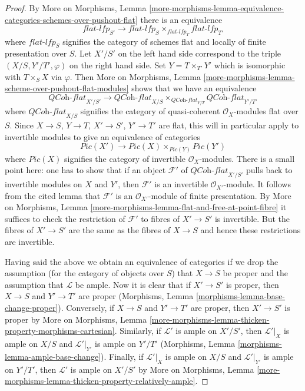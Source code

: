 \documentclass{stacks-project}
\theoremstyle{plain}
\theoremstyle{definition}
\theoremstyle{remark}
\numberwithin{equation}{subsection}
\begin{document}
\begin{proof}
By More on Morphisms, Lemma
\ref{more-morphisms-lemma-equivalence-categories-schemes-over-pushout-flat}
there is an equivalence
$$
\textit{flat-lfp}_{S'}
\longrightarrow
\textit{flat-lfp}_S \times_{\textit{flat-lfp}_T} \textit{flat-lfp}_{T'}
$$
where $\textit{flat-lfp}_S$ signifies the category of schemes flat
and locally of finite presentation over $S$.
Let $X'/S'$ on the left hand side correspond to the triple
$(X/S, Y'/T', \varphi)$ on the right hand side.
Set $Y = T \times_{T'} Y'$ which is isomorphic with
$T \times_S X$ via $\varphi$. Then More on Morphisms, Lemma
\ref{more-morphisms-lemma-scheme-over-pushout-flat-modules}
shows that we have an equivalence
$$
\textit{QCoh-flat}_{X'/S'}
\longrightarrow
\textit{QCoh-flat}_{X/S}
\times_{\textit{QCoh-flat}_{Y/T}} \textit{QCoh-flat}_{Y'/T'}
$$
where $\textit{QCoh-flat}_{X/S}$ signifies the category of
quasi-coherent $\mathcal{O}_X$-modules flat over $S$.
Since $X \to S$, $Y \to T$, $X' \to S'$, $Y' \to T'$ are
flat, this will in particular apply to invertible modules
to give an equivalence of categories
$$
\textit{Pic}(X')
\longrightarrow
\textit{Pic}(X) \times_{\textit{Pic}(Y)} \textit{Pic}(Y')
$$
where $\textit{Pic}(X)$ signifies the category of invertible
$\mathcal{O}_X$-modules. There is a small point here:
one has to show that if an object $\mathcal{F}'$
of $\textit{QCoh-flat}_{X'/S'}$
pulls back to invertible modules on $X$ and $Y'$, then
$\mathcal{F}'$ is an invertible $\mathcal{O}_{X'}$-module.
It follows from the cited lemma that $\mathcal{F}'$
is an $\mathcal{O}_{X'}$-module of finite presentation.
By More on Morphisms, Lemma
\ref{more-morphisms-lemma-flat-and-free-at-point-fibre}
it suffices to check the restriction of
$\mathcal{F}'$ to fibres of $X' \to S'$ is invertible.
But the fibres of $X' \to S'$ are the same as the fibres
of $X \to S$ and hence these restrictions are invertible.

\medskip\noindent
Having said the above we obtain an equivalence of categories if we drop
the assumption (for the category of objects over $S$) that $X \to S$ be proper
and the assumption that $\mathcal{L}$ be ample.
Now it is clear that if $X' \to S'$ is proper, then
$X \to S$ and $Y' \to T'$ are proper (Morphisms, Lemma
\ref{morphisms-lemma-base-change-proper}).
Conversely, if $X \to S$ and $Y' \to T'$ are proper, then
$X' \to S'$ is proper by
More on Morphisms, Lemma
\ref{more-morphisms-lemma-thicken-property-morphisms-cartesian}.
Similarly, if $\mathcal{L}'$ is ample on $X'/S'$, then
$\mathcal{L}'|_X$ is ample on $X/S$ and
$\mathcal{L}'|_{Y'}$ is ample on $Y'/T'$
(Morphisms, Lemma \ref{morphisms-lemma-ample-base-change}).
Finally, if $\mathcal{L}'|_X$ is ample on $X/S$ and
$\mathcal{L}'|_{Y'}$ is ample on $Y'/T'$, then
$\mathcal{L}'$ is ample on $X'/S'$ by
More on Morphisms, Lemma
\ref{more-morphisms-lemma-thicken-property-relatively-ample}.
\end{proof}
\end{document}
